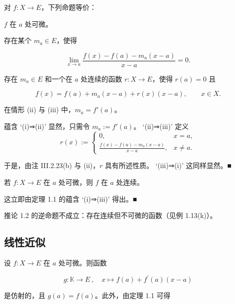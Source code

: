 \begin{theorem}

对 $f: X \to E$，下列命题等价：

\begin{subitems}
\item

$f$ 在 $a$ 处可微。

\item

存在某个 $ m_{a} \in E $，使得

\[
\lim_{x\to a}\frac{f(x)-f(a)-m_{a}(x-a)}{x-a}=0.
\]
\item

存在 $ m_a \in E $ 和一个在 $a$ 处连续的函数 $ r: X \to E $，使得 $ r(a) = 0 $ 且

\[
f(x)=f(a)+m_{a}(x-a)+r(x)(x-a),\qquad x\in X.
\]

在情形 (ii) 与 (iii) 中，$ m_{a}=f'(a) $。

\proofhead
蕴含 ‘(i)⇒(ii)’ 显然，只需令 $ m_a := f'(a) $。
‘(ii)⇒(iii)’ 定义
\begin{equation*}
r(x):=\left\{\begin{array}{cl}0,&x=a,\\\frac{f(x)-f(a)-m_{a}(x-a)}{x-a},&x\neq a.\end{array}\right.
\end{equation*}

于是，由注 III.2.23(b) 与 (ii)，$r$ 具有所述性质。
‘(iii)⇒(i)’ 这同样显然。■

\end{subitems}

\end{theorem}

\begin{corollary}

若 $f: X \to E$ 在 $a$ 处可微，则 $f$ 在 $a$ 处连续。

\proofhead
这立即由定理 1.1 的蕴含 ‘(i)⇒(iii)’ 得出。■
\end{corollary}

推论 1.2 的逆命题不成立：存在连续但不可微的函数（见例 1.13(k)）。

\subsection*{线性近似}

设 $f: X \to E$ 在 $a$ 处可微。则函数

\[
g:\mathbb{K}\to E~,\quad x\mapsto f(a)+f^{\prime}(a)(x-a)
\]

是仿射的，且 $ g(a) = f(a) $。此外，由定理 1.1 可得

